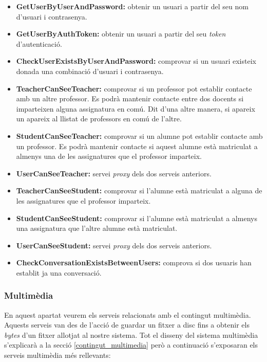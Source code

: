 		\begin{itemize}
			\item \textbf{GetUserByUserAndPassword:} obtenir un usuari a partir del seu nom d'usuari i contrasenya.
			\item \textbf{GetUserByAuthToken:} obtenir un usuari a partir del seu \emph{token} d'autenticació.
			\item \textbf{CheckUserExistsByUserAndPassword:} comprovar si un usuari existeix donada una combinació d'usuari i contrasenya.
			\item \textbf{TeacherCanSeeTeacher:} comprovar si un professor pot establir contacte amb un altre professor. Es podrà mantenir contacte entre dos docents si imparteixen alguna assignatura en comú. Dit d'una altre manera, si apareix un apareix al llistat de professors en comú de l'altre.
			\item \textbf{StudentCanSeeTeacher:} comprovar si un alumne pot establir contacte amb un professor. Es podrà mantenir contacte si aquest alumne està matriculat a almenys una de les assignatures que el professor imparteix.
			\item \textbf{UserCanSeeTeacher:} servei \emph{proxy} dels dos serveis anteriors.
			\item \textbf{TeacherCanSeeStudent:} comprovar si l'alumne està matriculat a alguna de les assignatures que el professor imparteix.
			\item \textbf{StudentCanSeeStudent:} comprovar si l'alumne està matriculat a almenys una assignatura que l'altre alumne està matriculat.
			\item \textbf{UserCanSeeStudent:} servei \emph{proxy} dels dos serveis anteriors.
			\item \textbf{CheckConversationExistsBetweenUsers:} comprova si dos usuaris han establit ja una conversació.
			
		\end{itemize}
			
		\subsubsection{Multimèdia}
		
		En aquest apartat veurem els serveis relacionats amb el contingut multimèdia. Aquests serveis van des de l'acció de guardar un fitxer a disc fins a obtenir els \emph{bytes} d'un fitxer allotjat al nostre sistema. Tot el disseny del sistema multimèdia s'explicarà a la secció \ref{contingut_multimedia} però a continuació s'exposaran els serveis multimèdia més rellevants:
		
